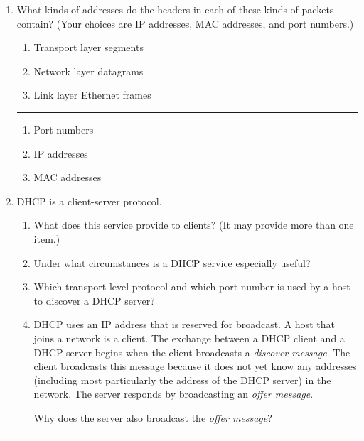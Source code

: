 \documentclass[twoside]{article}
\newenvironment{answer}
  {\vspace*{0.2cm} \rule{12cm}{0.04cm} \vspace*{0.2cm}}
  {\vspace*{0.2cm}}
\begin{document}
\begin{enumerate}
\begin{answer}
    \end{answer}

  \item What kinds of addresses do the headers in each of these kinds
      of packets contain? (Your choices are IP addresses, MAC addresses,
      and port numbers.)
  \begin{enumerate}
    \item Transport layer segments
    \item Network layer datagrams
    \item Link layer Ethernet frames
    \end{enumerate}

  \begin{answer}

  \begin{enumerate}
    \item Port numbers
    \item IP addresses
    \item MAC addresses
    \end{enumerate}

    \end{answer}

  \item DHCP is a client-server protocol.
  \begin{enumerate}
    \item What does this service provide to clients? (It may provide more than one item.) 
    \item Under what circumstances is a DHCP service especially useful?
    \item Which transport level protocol and which port number is used by
      a host to discover a DHCP server?
    \item DHCP uses an IP address that is reserved for broadcast. 
      A host that joins a network is a client.
      The exchange between a DHCP client and a DHCP server begins when
      the client broadcasts a \emph{discover message}.
      The client broadcasts this message because it does not yet know
      any addresses (including most particularly the address of the DHCP
      server) in the network.
      The server responds by broadcasting an \emph{offer message}.

      Why does the server also broadcast the \emph{offer message}?

    \end{enumerate}

  \begin{answer}


\end{answer}
\end{enumerate}
\end{document}
